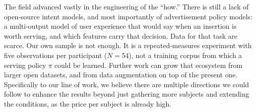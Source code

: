 \documentclass[english]{article}
\begin{document}
The field advanced vastly in the engineering of the ``how.'' There is still a lack of open-source intent models, and most importantly of advertisement policy models: a multi-output model of user experience that would say when an insertion is worth serving, and which features carry that decision. Data for that task are scarce. Our own sample is not enough. It is a repeated-measures experiment with five observations per participant (\(N=54\)), not a training corpus from which a serving policy \(\pi\) could be learned. Further work can grow that ecosystem from larger open datasets, and from data augmentation on top of the present one.
\\

Specifically to our line of work, we believe there are multiple directions we could follow to enhance the results beyond just gathering more subjects and extending the conditions, as the price per subject is already high.
\end{document}
